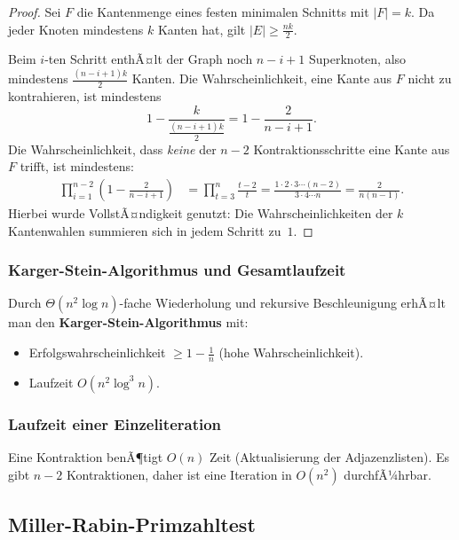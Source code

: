 ﻿\documentclass[12pt,a4paper]{article}
\theoremstyle{definition}
\theoremstyle{plain}
\theoremstyle{remark}
\begin{document}
\begin{proof}
  Sei $F$ die Kantenmenge eines festen minimalen Schnitts mit $|F| = k$.
  Da jeder Knoten mindestens $k$ Kanten hat, gilt $|E| \geq \frac{nk}{2}$.

  Beim $i$-ten Schritt enthÃ¤lt der Graph noch $n-i+1$ Superknoten, also
  mindestens $\frac{(n-i+1)k}{2}$ Kanten. Die Wahrscheinlichkeit, eine Kante
  aus $F$ nicht zu kontrahieren, ist mindestens
  \[
    1 - \frac{k}{\frac{(n-i+1)k}{2}} = 1 - \frac{2}{n-i+1}.
  \]
  Die Wahrscheinlichkeit, dass \emph{keine} der $n-2$ Kontraktionsschritte
  eine Kante aus $F$ trifft, ist mindestens:
  \begin{align*}
    \prod_{i=1}^{n-2}\!\left(1 - \frac{2}{n-i+1}\right)
    &= \prod_{t=3}^{n} \frac{t-2}{t}
    = \frac{1 \cdot 2 \cdot 3 \cdots (n-2)}{3 \cdot 4 \cdots n}
    = \frac{2}{n(n-1)}.
  \end{align*}
  Hierbei wurde VollstÃ¤ndigkeit genutzt: Die Wahrscheinlichkeiten der $k$
  Kantenwahlen summieren sich in jedem Schritt zu~$1$.
\end{proof}

\subsubsection{Karger-Stein-Algorithmus und Gesamtlaufzeit}

Durch $\Theta(n^2 \log n)$-fache Wiederholung und rekursive Beschleunigung
\cite{karger1996new} erhÃ¤lt man den \textbf{Karger-Stein-Algorithmus} mit:
\begin{itemize}
  \item Erfolgswahrscheinlichkeit $\geq 1 - \frac{1}{n}$ (hohe Wahrscheinlichkeit).
  \item Laufzeit $O(n^2 \log^3 n)$.
\end{itemize}

\subsubsection{Laufzeit einer Einzeliteration}

Eine Kontraktion benÃ¶tigt $O(n)$ Zeit (Aktualisierung der Adjazenzlisten).
Es gibt $n-2$ Kontraktionen, daher ist eine Iteration in $O(n^2)$ durchfÃ¼hrbar.

\subsection{Miller-Rabin-Primzahltest}
\label{subsec:miller}
\end{document}
